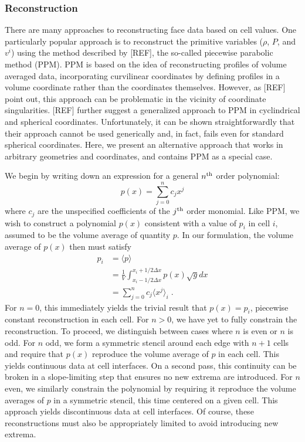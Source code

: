 \documentclass[iop]{emulateapj}
\begin{document}
\subsubsection{Reconstruction}
There are many approaches to reconstructing face data based on cell values.  One particularly popular approach is to reconstruct the primitive variables ($\rho$, $P$, and $v^i$) using the method described by [REF], the so-called piecewise parabolic method (PPM).  PPM is based on the idea of reconstructing profiles of volume averaged data, incorporating curvilinear coordinates by defining profiles in a volume coordinate rather than the coordinates themselves.  However, as [REF] point out, this approach can be problematic in the vicinity of coordinate singularities.  [REF] further suggest a generalized approach to PPM in cyclindrical and spherical coordinates.  Unfortunately, it can be shown straightforwardly that their approach cannot be used generically and, in fact, fails even for standard spherical coordinates.  Here, we present an alternative approach that works in arbitrary geometries and coordinates, and contains PPM as a special case.

We begin by writing down an expression for a general $n^{\rm th}$ order polynomial:
\begin{equation}
p(x) = \sum_{j=0}^n c_j x^j
\end{equation}
where $c_j$ are the unspecified coefficients of the $j^{\rm th}$ order monomial.  Like PPM, we wish to construct a polynomial $p(x)$ consistent with a value of $p_i$ in cell $i$, assumed to be the volume average of quantity $p$.  In our formulation, the volume average of $p(x)$ then must satisfy
\begin{align}
p_i &= \langle p \rangle \\
    &= \frac{1}{V} \int_{x_i-1/2\Delta x}^{x_i+1/2\Delta x} p(x) \sqrt{g} dx \\
    &= \sum_{j=0}^n c_j \langle x^j \rangle_i\;.
\end{align}
For $n=0$, this immediately yields the trivial result that $p(x)=p_i$, piecewise constant reconstruction in each cell.  For $n>0$, we have yet to fully constrain the reconstruction.  To proceed, we distinguish between cases where $n$ is even or $n$ is odd.  For $n$ odd, we form a symmetric stencil around each edge with $n+1$ cells and require that $p(x)$ reproduce the volume average of $p$ in each cell.  This yields continuous data at cell interfaces.  On a second pass, this continuity can be broken in a slope-limiting step that ensures no new extrema are introduced.  For $n$ even, we similarly constrain the polynomial by requiring it reproduce the volume averages of $p$ in a symmetric stencil, this time centered on a given cell.  This approach yields discontinuous data at cell interfaces.  Of course, these reconstructions must also be appropriately limited to avoid introducing new extrema.
\end{document}
